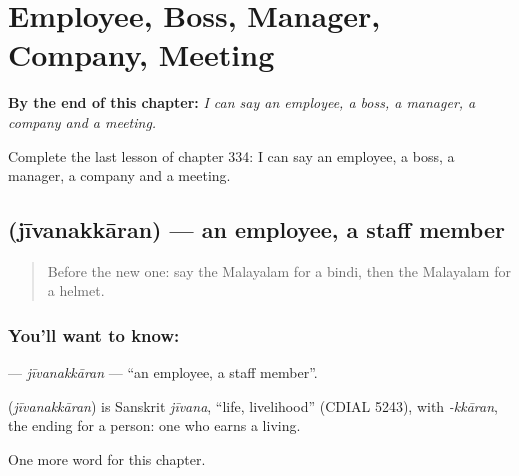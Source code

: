 
\chapter{Employee, Boss, Manager, Company, Meeting}
\label{ch:ml-employee-boss-manager-company-meeting}

\begin{chapteropening}
\textbf{By the end of this chapter:} \emph{I can say an employee, a boss, a manager, a company and a meeting.}

Complete the last lesson of chapter 334: I can say an employee, a boss, a manager, a company and a meeting.
\end{chapteropening}

\section[\texorpdfstring{\ml{ജീവനക്കാരൻ} (jīvanakkāran)}{ജീവനക്കാരൻ (jīvanakkāran)}]{ (jīvanakkāran) — an employee, a staff member}

\label{lesson:ML-C334-jivanakkaran}



\begin{quote}
Before the new one: say the Malayalam for a bindi, then the Malayalam for a helmet.
\end{quote}

\subsection*{You'll want to know: }
\textbf{} — \emph{jīvanakkāran} — \textquotedblleft{}an employee, a staff member\textquotedblright{}.

\begin{cousinweb}
\textbf{} (\emph{jīvanakkāran}) is Sanskrit \emph{jīvana}, \textquotedblleft{}life, livelihood\textquotedblright{} (CDIAL 5243), with \emph{-kkāran}, the ending for a person: one who earns a living.
\end{cousinweb}

\begin{grammarlens}[title={What you've built}]
One more word for this chapter.
\end{grammarlens}

